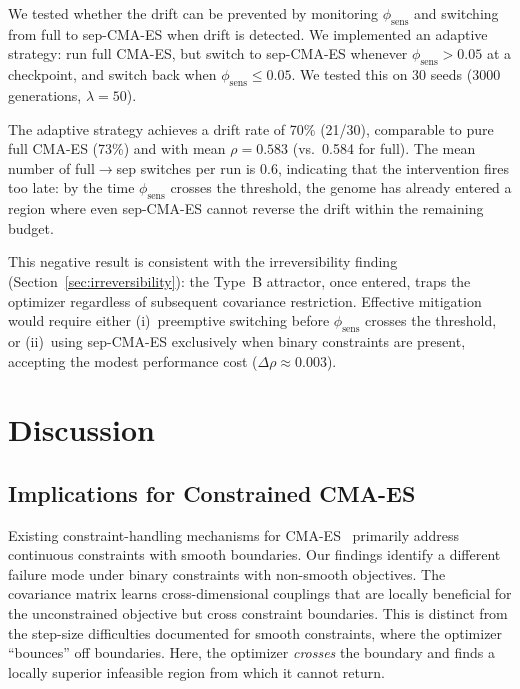 \documentclass[twoside,11pt]{article}
\begin{document}
We tested whether the drift can be prevented by monitoring
$\phi_{\text{sens}}$ and switching from full to sep-CMA-ES when drift is
detected. We implemented an adaptive strategy: run full CMA-ES, but switch
to sep-CMA-ES whenever $\phi_{\text{sens}} > 0.05$ at a checkpoint, and
switch back when $\phi_{\text{sens}} \leq 0.05$. We tested this on 30 seeds
(3000 generations, $\lambda = 50$).

The adaptive strategy achieves a drift rate of 70\% (21/30), comparable to
pure full CMA-ES (73\%) and with mean $\rho = 0.583$ (vs.\ 0.584 for full).
The mean number of full$\to$sep switches per run is 0.6, indicating that the
intervention fires too late: by the time $\phi_{\text{sens}}$ crosses the
threshold, the genome has already entered a region where even sep-CMA-ES
cannot reverse the drift within the remaining budget.

This negative result is consistent with the irreversibility finding
(Section~\ref{sec:irreversibility}): the Type~B attractor, once entered,
traps the optimizer regardless of subsequent covariance restriction. Effective
mitigation would require either (i)~preemptive switching before
$\phi_{\text{sens}}$ crosses the threshold, or (ii)~using sep-CMA-ES
exclusively when binary constraints are present, accepting the modest
performance cost ($\Delta\rho \approx 0.003$).

\section{Discussion}
\label{sec:discussion}

\subsection{Implications for Constrained CMA-ES}

Existing constraint-handling mechanisms for CMA-ES~\citep{arnold2012cmaes,
kramer2010cmaes,atamna2016augmented} primarily address continuous constraints
with smooth boundaries. Our findings identify a different failure
mode under binary constraints with non-smooth objectives. The covariance matrix
learns cross-dimensional couplings that are locally beneficial for the
unconstrained objective but cross constraint boundaries. This is distinct
from the step-size difficulties documented for smooth constraints, where the
optimizer ``bounces'' off boundaries. Here, the optimizer \emph{crosses} the
boundary and finds a locally superior infeasible region from which it cannot
return.
\end{document}
